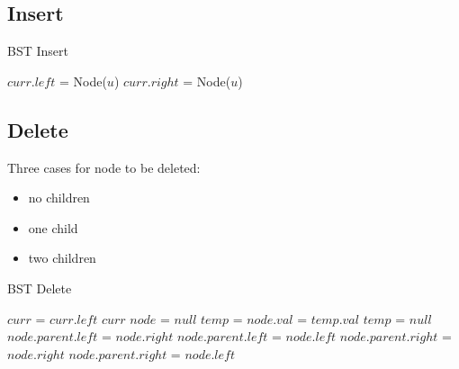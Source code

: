 \documentclass{article}
\begin{document}
\subsection{Insert}
\begin{algorithm}[H]
\caption{BST Insert}
\begin{algorithmic}
            \State $curr.left$ = Node($u$)
        \Else
            \State {}
        \EndIf
    \Else
            \State $curr.right$ = Node($u$)
        \Else
            \State {}
        \EndIf
    \EndIf

\EndFunction
\end{algorithmic}
\end{algorithm}

\subsection{Delete}
Three cases for node to be deleted:
\begin{itemize}
    \item no children
    \item one child
    \item two children
\end{itemize}

\begin{algorithm}[H]
\caption{BST Delete}
\begin{algorithmic}
        \State $curr$ = $curr.left$
    \EndWhile
    \State \Return $curr$
\EndFunction
{}
        \State $node$ = $null$
    \EndIf
        \State $temp$ = 
        \State $node.val$ = $temp.val$
        \State $temp$ = $null$
    \Else
                \State $node.parent.left$ = $node.right$
            \Else
                \State $node.parent.left$ = $node.left$
            \EndIf
        \Else
                \State $node.parent.right$ = $node.right$
            \Else
                \State $node.parent.right$ = $node.left$
            \EndIf
        \EndIf
    \EndIf

\EndFunction
\end{algorithmic}
\end{algorithm}
\end{document}
